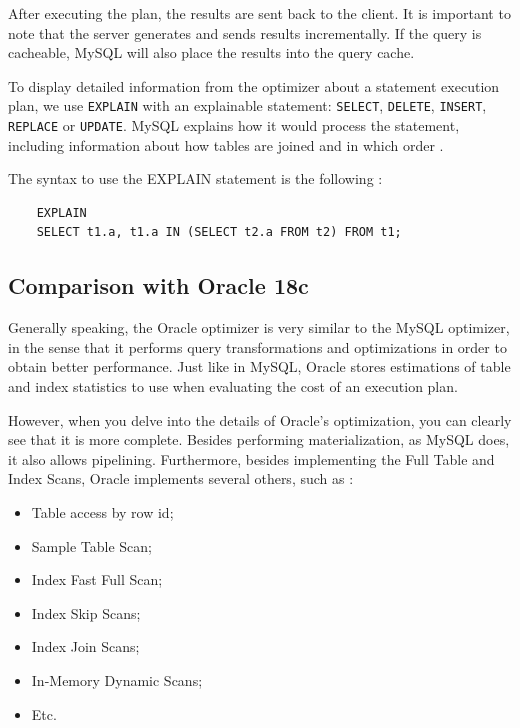 \documentclass[12pt]{article}
\begin{document}
After executing the plan, the results are sent back to the client. It is important to note that the server generates and sends results incrementally. If the query is cacheable, MySQL will also place the results into the query cache. 

\vspace{0.3cm}

To display detailed information from the optimizer about a statement execution plan, we use \verb|EXPLAIN| with an explainable statement: \verb|SELECT|, \verb|DELETE|, \verb|INSERT|, \verb|REPLACE| or \verb|UPDATE|. MySQL explains how it would process the statement, including information about how tables are joined and in which order \parencite{ExplainStatement}. 

\vspace{0.3cm}
\noindent The syntax to use the EXPLAIN statement is the following \parencite{ExplainStatementOutput}:
\begin{verbatim}
    EXPLAIN
    SELECT t1.a, t1.a IN (SELECT t2.a FROM t2) FROM t1;
\end{verbatim}


\subsection{Comparison with Oracle 18c}
\label{optimizingComp} 
Generally speaking, the Oracle optimizer is very similar to the MySQL optimizer, in the sense that it performs query transformations and optimizations in order to obtain better performance. Just like in MySQL, Oracle stores estimations of table and index statistics to use when evaluating the cost of an execution plan.

However, when you delve into the details of Oracle's optimization, you can clearly see that it is more complete. Besides performing materialization, as MySQL does, it also allows pipelining. Furthermore, besides implementing the Full Table and Index Scans, Oracle implements several others, such as \parencite{OptimizerAccessPaths}:
\begin{itemize}
    \item Table access by row id;
    \item Sample Table Scan;
    \item Index Fast Full Scan;
    \item Index Skip Scans;
    \item Index Join Scans;
    \item In-Memory Dynamic Scans;
    \item Etc.
\end{itemize}
\end{document}
